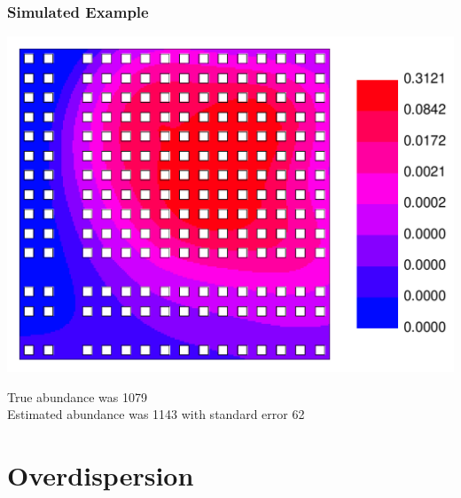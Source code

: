 \documentclass[mathserif,compress]{beamer}\usepackage{graphicx, color}
\makeatletter
\def\maxwidth{ %
  \ifdim\Gin@nat@width>\linewidth
    \linewidth
  \else
    \Gin@nat@width
  \fi
}
\makeatother
\begin{document}
\begin{frame}[fragile]
\frametitle{Simulated Example}




		\vspace{-.1cm}
		\begin{center}
		\includegraphics[width = .55\maxwidth]{figure/exFittedSurface-plot} \\
		\end{center}
		\vspace{-.2cm}
		True abundance was 1079 \\
		Estimated abundance was 1143 with standard error 62

\end{frame}


\section{Overdispersion}
\end{document}
